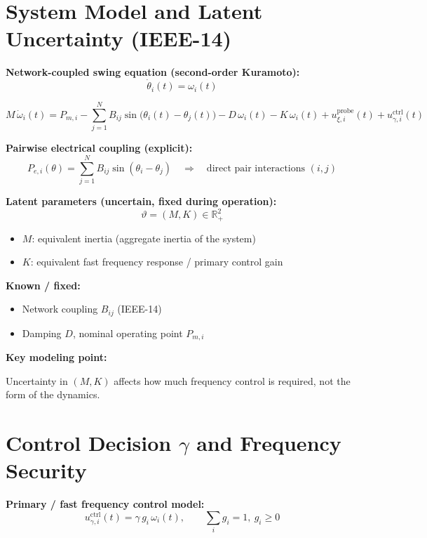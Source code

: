 \newpage
\section*{System Model and Latent Uncertainty (IEEE-14)}

\textbf{Network-coupled swing equation (second-order Kuramoto):}
\[
\dot{\theta}_i(t) = \omega_i(t)
\]

\[
M\,\dot{\omega}_i(t)
=
P_{m,i}
-
\sum_{j=1}^{N} B_{ij}\sin\!\big(\theta_i(t)-\theta_j(t)\big)
-
D\,\omega_i(t)
-
K\,\omega_i(t)
+
u^{\text{probe}}_{\xi,i}(t)
+
u^{\text{ctrl}}_{\gamma,i}(t)
\]

\vspace{0.3em}
\textbf{Pairwise electrical coupling (explicit):}
\[
P_{e,i}(\theta)
=
\sum_{j=1}^{N} B_{ij}\sin(\theta_i-\theta_j)
\quad\Rightarrow\quad
\text{direct pair interactions }(i,j)
\]

\vspace{0.3em}
\textbf{Latent parameters (uncertain, fixed during operation):}
\[
\vartheta = (M, K)\in\mathbb{R}_+^2
\]

\begin{itemize}
  \item $M$: equivalent inertia (aggregate inertia of the system)
  \item $K$: equivalent fast frequency response / primary control gain
\end{itemize}

\textbf{Known / fixed:}
\begin{itemize}
  \item Network coupling $B_{ij}$ (IEEE-14)
  \item Damping $D$, nominal operating point $P_{m,i}$
\end{itemize}

\vspace{0.3em}
\textbf{Key modeling point:}

Uncertainty in $(M,K)$ affects how much frequency control is required,
not the form of the dynamics.

\newpage
\section*{Control Decision $\gamma$ and Frequency Security}

\textbf{Primary / fast frequency control model:}
\[
u^{\text{ctrl}}_{\gamma,i}(t)
=
\gamma\, g_i\,\omega_i(t),
\qquad
\sum_i g_i = 1,\ g_i\ge 0
\]

